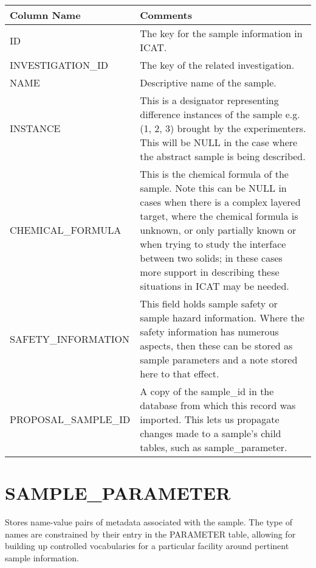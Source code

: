 \documentclass{report}
\begin{document}
\begin{tabular}{|l|l|}
\hline
Column Name & Comments \\ \hline
ID & \multicolumn{1}{p{100mm}|}{
The key for the sample information in ICAT.} \\ \hline
INVESTIGATION\_ID & \multicolumn{1}{p{100mm}|}{
The key of the related investigation.} \\ \hline
NAME & \multicolumn{1}{p{100mm}|}{
Descriptive name of the sample.} \\ \hline
INSTANCE & \multicolumn{1}{p{100mm}|}{
This is a designator representing difference instances of the sample e.g. (1, 2, 3)  brought by the experimenters. This will be NULL in the case where the abstract sample is being described.} \\ \hline
CHEMICAL\_FORMULA & \multicolumn{1}{p{100mm}|}{
This is the chemical formula of the sample. Note this can be NULL in cases when there is a complex layered target, where the chemical formula is unknown, or only partially known or when trying to study the interface between two solids; in these cases more support in describing these situations in ICAT may be needed.} \\ \hline
SAFETY\_INFORMATION & \multicolumn{1}{p{100mm}|}{
This field holds sample safety or sample hazard information. Where the safety information has numerous aspects, then these can be stored as sample parameters and a note stored here to that effect.} \\ \hline
PROPOSAL\_SAMPLE\_ID & \multicolumn{1}{p{100mm}|}{
A copy of the sample\_id in the database from which this record was imported.  This lets us propagate changes made to a sample's child tables, such as  sample\_parameter.} \\ \hline
\end{tabular}
\section{SAMPLE\_PARAMETER}

Stores name-value pairs of metadata associated with the sample. The type of names are constrained by their entry in the PARAMETER table, allowing for building up controlled vocabularies for a particular facility around pertinent sample information.\\
\end{document}
